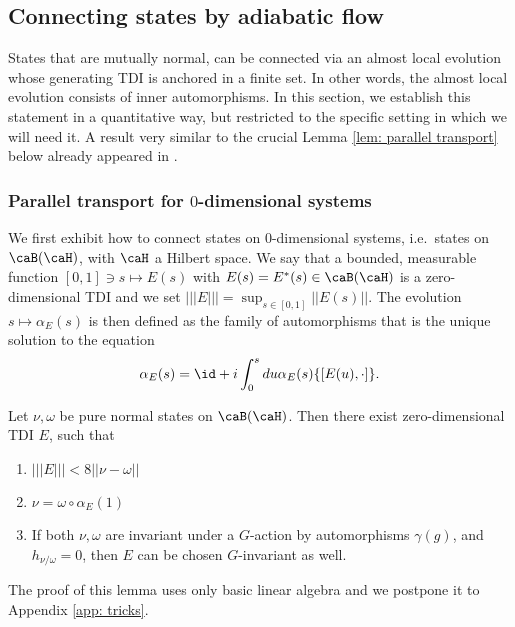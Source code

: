\subsection{Connecting states by adiabatic flow}

States that are mutually normal, can be connected via an almost local evolution whose generating TDI is anchored in a finite set. In other words, the almost local evolution consists of inner automorphisms. In this section, we establish this statement in a quantitative way, but restricted to the specific setting in which we will need it.  A result very similar to the crucial Lemma \ref{lem: parallel transport} below already appeared in \cite{kapustin2021classification}. 


\subsubsection{Parallel transport for $0$-dimensional systems}\label{Parallel in 0d}

We first exhibit how to connect states on $0$-dimensional systems, i.e.\ states on $\caB(\caH)$, with $\caH$ a Hilbert space. We say that a bounded, measurable function $[0,1]\ni s\mapsto E(s)$ with $E(s)=E^*(s)\in \caB(\caH) $ is a zero-dimensional TDI and we set $|||E|||=\sup_{s\in [0,1]} ||E(s)||$.
The evolution $s\mapsto \alpha_E(s)$ is then defined as the family of automorphisms that is the unique solution to the equation 
$$\alpha_E(s)=\id+i\int_0^sdu \alpha_E(s)\{[E(u),\cdot]\}.$$ 
\begin{lemma}\label{lem: parallel transport simple}
	Let $\nu,\omega$ be pure normal states on $\caB(\caH)$.
	Then there exist zero-dimensional TDI $E$, such that 
	\begin{enumerate}
		\item   $|||E||| < 8 || \nu-\omega ||$
		\item $\nu = \omega\circ \alpha_E(1)$
		\item  If both $\nu,\omega$ are invariant under a $G$-action by automorphisms $\gamma(g)$, and $h_{\nu/\omega}=0$, then $E$ can be chosen $G$-invariant as well.
	\end{enumerate}
\end{lemma}
The proof of this lemma uses only basic linear algebra and we postpone it to Appendix \ref{app: tricks}.



